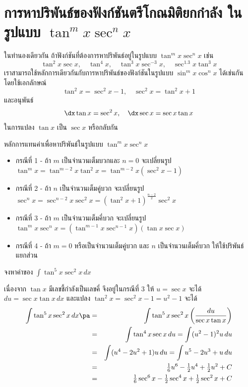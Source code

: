 \section[$\tan^m x \sec^n x$]{การหาปริพันธ์ของฟังก์ชันตรีโกณมิติยกกำลัง ในรูปแบบ $\tan^m x \sec^n x$}
\frame{\sectionpage}

\begin{frame}
ในทำนองเดียวกัน ถ้าฟังก์ชันที่ต้องการหาปริพันธ์อยู่ในรูปแบบ $\tan^m x \sec^n x$ เช่น
\[ \tan^2 x \sec x, \quad \tan^4 x, \quad \tan^3 x \sec ^{-3} x, \quad \sec^{1.3} x \tan^3 x \] \pa
เราสามารถใช้หลักการเดียวกันกับการหาปริพันธ์ของฟังก์ชันในรูปแบบ $\sin^m x \cos^n x$ ได้เช่นกัน โดยใช้เอกลักษณ์
\[ \tan^2 x = \sec^2 x - 1, \quad \sec^2 x = \tan^2 x + 1 \]
และอนุพันธ์ 
\[ \dx \tan x = \sec^2 x, \quad \dx \sec x = \sec x \tan x\] 
ในการแปลง $\tan x$ เป็น $\sec x$ หรือกลับกัน
\end{frame}

\begin{frame}{หลักการแทนค่าเพื่อหาปริพันธ์ในรูปแบบ $\tan^m x \sec^n x$}
\begin{itemize}
\item กรณีที่ 1 - ถ้า $m$ เป็นจำนวนเต็มบวกและ $n=0$ จะเปลี่ยนรูป $\tan^m x = \tan^{m-2}x \tan^2 x = \tan^{m-2} x (\sec^2 x -1)$ 
\item กรณีที่ 2 - ถ้า $n$ เป็นจำนวนเต็มคู่บวก จะเปลี่ยนรูป $\sec^n x = \sec^{n-2} x \sec^2 x = (\tan^2 x + 1)^{\frac{n-2}{2}} \sec^2 x$
\item กรณีที่ 3 - ถ้า $m$ เป็นจำนวนเต็มคี่บวก จะเปลี่ยนรูป $\tan^m x \sec^n x = (\tan^{m-1} x \sec^{n-1} x) (\tan x \sec x)$
\item กรณีที่ 4 - ถ้า $m=0$ หรือเป็นจำนวนเต็มคู่บวก และ $n$ เป็นจำนวนเต็มคี่บวก ให้ใช้ปริพันธ์แยกส่วน
\end{itemize}
\end{frame}

\begin{frame}[t]
\begin{ex}
จงหาค่าของ $ \int \tan^5 x \sec^2 x \, dx$
\end{ex}
\begin{sol}
เนื่องจาก $\tan x$ มีเลขชี้กำลังเป็นเลขคี่ จึงอยู่ในกรณีที่ 3 ให้ $u = \sec x$ จะได้ $du = \sec x \tan x\, dx$  และแปลง $\tan^2 x = \sec^2 x - 1 = u^2-1$ จะได้ \pa
\begin{eqnarray*}
\int \tan^5 x \sec^2 x \, dx \pa &=& \int\tan^5 x \sec^2 x \left( \frac{du}{\sec x \tan x} \right) \\ 
&=& \int \tan^4 x \sec x \, du = \int (u^2-1)^2 u \, du \\
&=& \int (u^4 - 2u^2 + 1) u \, du = \int u^5 - 2u^3 + u \, du  \\
&=& \tfrac{1}{6} u^6 - \tfrac{1}{2} u^4 + \tfrac{1}{2} u^2 + C \\
&=& \tfrac{1}{6} \sec^6 x - \tfrac{1}{2} \sec^4 x + \tfrac{1}{2} \sec^2 x + C
\end{eqnarray*}
\end{sol}
\end{frame}

